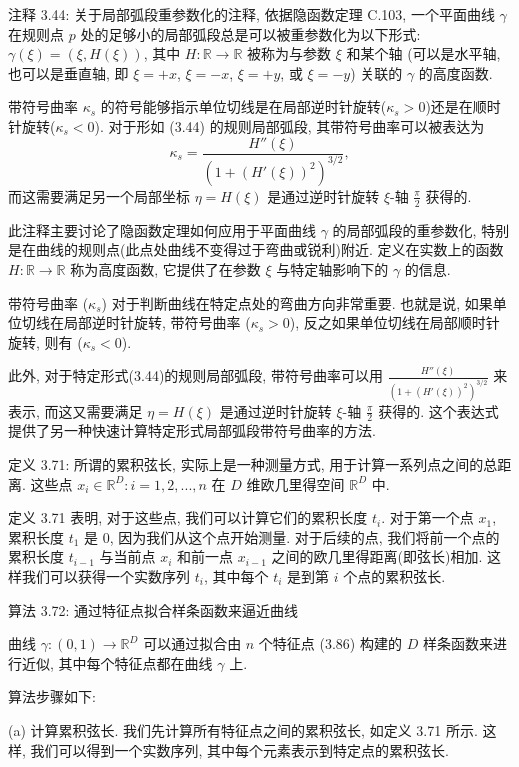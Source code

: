 \documentclass[a4paper]{ctexart}
\begin{document}
注释 3.44: 关于局部弧段重参数化的注释, 依据隐函数定理 C.103, 一个平面曲线 $\gamma$ 在规则点 $p$ 
处的足够小的局部弧段总是可以被重参数化为以下形式: $\gamma(\xi) = (\xi, H(\xi))$, 
其中 $H: \mathbb{R} \rightarrow \mathbb{R}$ 被称为与参数 $\xi$ 和某个轴
(可以是水平轴, 也可以是垂直轴, 即 $\xi = +x$, $\xi = -x$, $\xi = +y$, 或 $\xi = -y$) 关联的 $\gamma$ 的高度函数.

带符号曲率 $\kappa_s$ 的符号能够指示单位切线是在局部逆时针旋转($\kappa_s > 0$)还是在顺时针旋转($\kappa_s < 0$). 
对于形如 (3.44) 的规则局部弧段, 其带符号曲率可以被表达为
$$
\kappa_s = \frac{H''(\xi)}{(1 + (H'(\xi))^2)^{3/2}},
$$
而这需要满足另一个局部坐标 $\eta = H(\xi)$ 是通过逆时针旋转 $\xi$-轴 $\frac{\pi}{2}$ 获得的.

此注释主要讨论了隐函数定理如何应用于平面曲线 $\gamma$ 的局部弧段的重参数化, 特别是在曲线的规则点(此点处曲线不变得过于弯曲或锐利)附近.
定义在实数上的函数 $H: \mathbb{R} \rightarrow \mathbb{R}$ 称为高度函数, 它提供了在参数 $\xi$ 
与特定轴影响下的 $\gamma$ 的信息.

带符号曲率 ($\kappa_s$) 对于判断曲线在特定点处的弯曲方向非常重要. 
也就是说, 如果单位切线在局部逆时针旋转, 带符号曲率 ($\kappa_s > 0$), 反之如果单位切线在局部顺时针旋转, 则有 ($\kappa_s < 0$).

此外, 对于特定形式(3.44)的规则局部弧段, 带符号曲率可以用 $\frac{H''(\xi)}{(1 + (H'(\xi))^2)^{3/2}}$ 来表示, 
而这又需要满足 $\eta = H(\xi)$ 是通过逆时针旋转 $\xi$-轴 $\frac{\pi}{2}$ 获得的. 
这个表达式提供了另一种快速计算特定形式局部弧段带符号曲率的方法.

定义 3.71: 所谓的累积弦长, 实际上是一种测量方式, 用于计算一系列点之间的总距离. 
这些点 ${x_i \in \mathbb{R}^D : i = 1, 2, . . . , n}$ 在 $D$ 维欧几里得空间 $\mathbb{R}^D$ 中. 

定义 3.71 表明, 对于这些点, 我们可以计算它们的累积长度 $t_i$. 
对于第一个点 $x_1$, 累积长度 $t_1$ 是 0, 因为我们从这个点开始测量. 
对于后续的点, 我们将前一个点的累积长度 $t_{i-1}$ 与当前点 $x_i$ 和前一点 $x_{i-1}$ 之间的欧几里得距离(即弦长)相加.
这样我们可以获得一个实数序列 $t_i$, 其中每个 $t_i$ 是到第 $i$ 个点的累积弦长.

算法 3.72: 通过特征点拟合样条函数来逼近曲线

曲线 $\gamma : (0, 1) \rightarrow \mathbb{R}^D$ 可以通过拟合由 $n$ 个特征点 (3.86) 构建的 $D$ 样条函数来进行近似, 
其中每个特征点都在曲线 $\gamma$ 上.

算法步骤如下:

(a) 计算累积弦长. 我们先计算所有特征点之间的累积弦长, 如定义 3.71 所示. 这样, 我们可以得到一个实数序列, 其中每个元素表示到特定点的累积弦长.
\end{document}
